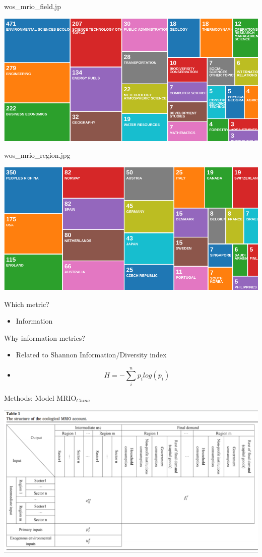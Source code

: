 \begin{frame}{wos\_mrio\_field.jp}

\begin{center}\includegraphics[width=0.5\linewidth]{images/wos_mrio_field} \end{center}

\end{frame}

\begin{frame}{wos\_mrio\_region.jpg}

\begin{center}\includegraphics[width=0.5\linewidth]{images/wos_mrio_region} \end{center}

\end{frame}

\begin{frame}{Which metric?}

\begin{itemize}
\item
  Information
\end{itemize}

\end{frame}

\begin{frame}{Why information metrics?}

\begin{itemize}
\item
  Related to Shannon Information/Diversity index
\item
  \[H = -\sum_i^n p_i log(p_i)\]
\end{itemize}

\end{frame}

\begin{frame}{Methods: Model MRIO\(_{China}\)}

\begin{center}\includegraphics[width=0.5\linewidth]{images/Wu_2018_Table1} \end{center}

\end{frame}

